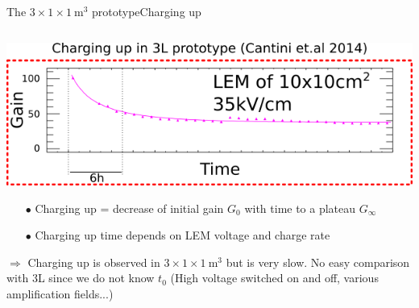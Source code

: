 \documentclass[10pt]{beamer}
\begin{document}
    \begin{frame}{The \texorpdfstring{$3 \times 1 \times \SI{1}{\meter\cubed}$}{311} prototype}{Charging up}
    	\begin{scriptsize}
    		\begin{columns}
    			\begin{column}{0.45\textwidth}
    				\includegraphics[width=\textwidth]{figures/311/3L_charging_up.png}\\
    				\vfill
    				\begin{itemize}
    					\item[$\bullet$] Charging up = decrease of initial gain $G_0$ with time to a plateau $G_{\infty}$
    					\item[$\bullet$] Charging up time depends on LEM voltage and charge rate
    				\end{itemize}
    				$\Rightarrow$ Charging up is observed in $3 \times 1 \times \SI{1}{\meter\cubed}$ but is very slow. No easy comparison with 3L since we do not know $t_0$ (High voltage switched on and off, various amplification fields...)

\end{column}
\end{columns}
\end{scriptsize}
\end{frame}
\end{document}
